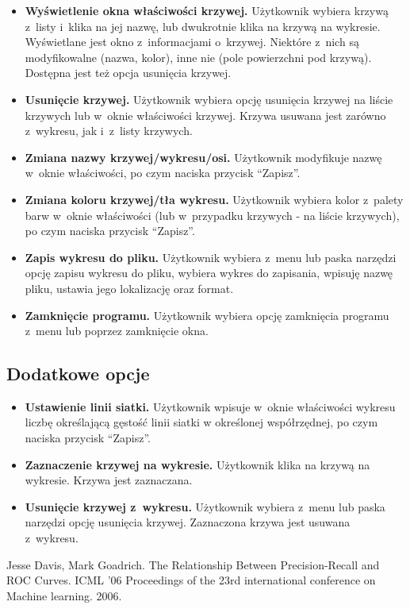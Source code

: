 \documentclass[12pt,a4paper,titlepage]{article}
\begin{document}
\begin{itemize}
\item \textbf{Wyświetlenie okna właściwości krzywej.} Użytkownik wybiera krzywą z~listy i~klika na jej nazwę, lub dwukrotnie klika na krzywą na wykresie. Wyświetlane jest okno z~informacjami o~krzywej. Niektóre z~nich są modyfikowalne (nazwa, kolor), inne nie (pole powierzchni pod krzywą). Dostępna jest też opcja usunięcia krzywej.
\item \textbf{Usunięcie krzywej.} Użytkownik wybiera opcję usunięcia krzywej na liście krzywych lub w~oknie właściwości krzywej. Krzywa usuwana jest zarówno z~wykresu, jak i~z~listy krzywych.
\item \textbf{Zmiana nazwy krzywej/wykresu/osi.} Użytkownik modyfikuje nazwę w~oknie właściwości, po czym naciska przycisk “Zapisz”.
\item \textbf{Zmiana koloru krzywej/tła wykresu.} Użytkownik wybiera kolor z~palety barw w~oknie właściwości (lub w~przypadku krzywych - na liście krzywych), po czym naciska przycisk “Zapisz”.
\item \textbf{Zapis wykresu do pliku.} Użytkownik wybiera z~menu lub paska narzędzi opcję zapisu wykresu do pliku, wybiera wykres do zapisania, wpisuję nazwę pliku, ustawia jego lokalizację oraz format.
\item \textbf{Zamknięcie programu.} Użytkownik wybiera opcję zamknięcia programu z~menu lub poprzez zamknięcie okna.
\end{itemize}
\subsection{Dodatkowe opcje}
\begin{itemize}
\item \textbf{Ustawienie linii siatki.} Użytkownik wpisuje w~oknie właściwości wykresu liczbę określającą gęstość linii siatki w określonej współrzędnej, po czym naciska przycisk “Zapisz”.
\item \textbf{Zaznaczenie krzywej na wykresie.} Użytkownik klika na krzywą na wykresie. Krzywa jest zaznaczana.
\item \textbf{Usunięcie krzywej z~wykresu.} Użytkownik wybiera z~menu lub paska narzędzi opcję usunięcia krzywej. Zaznaczona krzywa jest usuwana z~wykresu.
\end{itemize}
\begin{thebibliography}{1}
Jesse Davis, Mark Goadrich. The Relationship Between Precision-Recall and ROC Curves. ICML '06 Proceedings of the 23rd international conference on Machine learning. 2006.
\end{thebibliography}
\end{document}
